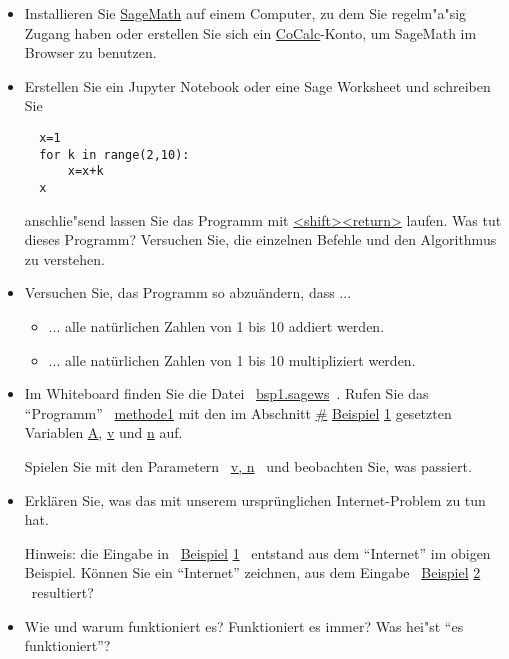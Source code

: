 \documentclass[a4,11pt]{article}
\begin{document}
\begin{aufgabe}
  \mbox{}  
  \begin{itemize}  
  \item Installieren Sie \href{www.sagemath.org}{SageMath} auf einem
    Computer, zu dem Sie regelm"a"sig Zugang haben oder erstellen Sie
    sich ein \href{cocalc.com}{CoCalc}-Konto, um SageMath im Browser
    zu benutzen.
  \item Erstellen Sie ein Jupyter Notebook oder eine Sage Worksheet
    und schreiben Sie
\begin{verbatim}
  x=1
  for k in range(2,10):
      x=x+k
  x
\end{verbatim}
    anschlie"send lassen Sie das Programm mit \url{<shift><return>}
    laufen.
    Was tut dieses Programm? 
    Versuchen Sie, die einzelnen Befehle und den Algorithmus zu verstehen.
  \item
    Versuchen Sie, das Programm so abzu\"andern, dass ...
    \begin{itemize}
      \setlength{\itemsep}{0mm}
    \item ... alle nat\"urlichen Zahlen von 1 bis 10 addiert werden.
    \item ... alle nat\"urlichen Zahlen von 1 bis 10 multipliziert werden.
    \end{itemize}
  \end{itemize}
\end{aufgabe}

\begin{aufgabe}
  \mbox{}
  \begin{itemize}
  \item Im Whiteboard
    finden Sie die Datei \ \url{bsp1.sagews}~. %
    Rufen Sie das "`Programm"' \ \url{methode1} mit den im Abschnitt
    \url{#} \url{Beispiel} \url{1} gesetzten Variablen \url{A}, \url{v} und
    \url{n} auf.
    
    Spielen Sie mit den Parametern \ \url{v, n} \ und beobachten Sie,
    was passiert.
  \item Erkl\"aren Sie, was das mit unserem urspr\"unglichen
    Internet-Problem zu tun hat.

    Hinweis: die Eingabe in \ \url{Beispiel} \url{1} \ entstand aus
    dem "`Internet"' im obigen Beispiel. K\"onnen Sie ein "`Internet"'
    zeichnen, aus dem Eingabe \ \url{Beispiel} \url{2} \ resultiert?
  \item Wie und warum funktioniert es? Funktioniert es immer? Was hei"st
    "`es funktioniert"'?
  \end{itemize}

\end{aufgabe}
\end{document}
